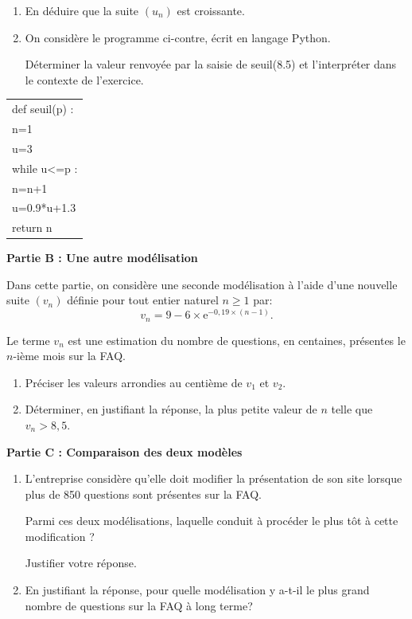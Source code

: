 \documentclass[10pt]{article}
\begin{document}
\begin{minipage}{0.62\linewidth}
\begin{enumerate}[resume]
\item  En déduire que la suite $\left(u_n\right)$ est croissante.
\item On considère le programme ci-contre, écrit en langage Python.

Déterminer la valeur renvoyée par la saisie de seuil(8.5) et l'interpréter dans le contexte de l'exercice.
\end{enumerate}
\end{minipage}\hfill
\begin{minipage}{0.32\linewidth}
\renewcommand\arraystretch{0.9}
\begin{tabularx}{\linewidth}{|X|} \hline
def seuil(p) :\\
\qquad n=1\\
\qquad u=3\\
\qquad while u<=p :\\
\qquad  \qquad n=n+1\\
\qquad \qquad u=0.9*u+1.3 \\
\qquad return n\\ \hline
\end{tabularx}
\end{minipage}

\bigskip

\textbf{Partie B : Une autre modélisation}

\medskip

Dans cette partie, on considère une seconde modélisation à l'aide d'une nouvelle
suite $\left(v_n\right)$ définie pour tout entier naturel $n \geqslant 1$ par:
\[v_n = 9 - 6 \times \text{e}^{-0,19\times(n - 1)}.\]

Le terme $v_n$ est une estimation du nombre de questions, en centaines, présentes le $n$-ième mois sur la FAQ.

\medskip

\begin{enumerate}
\item Préciser les valeurs arrondies au centième de $v_1$ et $v_2$.
\item Déterminer, en justifiant la réponse, la plus petite valeur de $n$ telle que $v_n > 8,5$.
\end{enumerate}

\bigskip

\textbf{Partie C : Comparaison des deux modèles}

\medskip

\begin{enumerate}
\item L'entreprise considère qu'elle doit modifier la présentation de son site lorsque plus de 850 questions sont présentes sur la FAQ. 

Parmi ces deux modélisations, laquelle conduit à procéder le plus tôt à cette modification ?

Justifier votre réponse.
\item En justifiant la réponse, pour quelle modélisation y a-t-il le plus grand nombre de questions sur la FAQ à long terme?
\end{enumerate}

\bigskip
\end{document}
